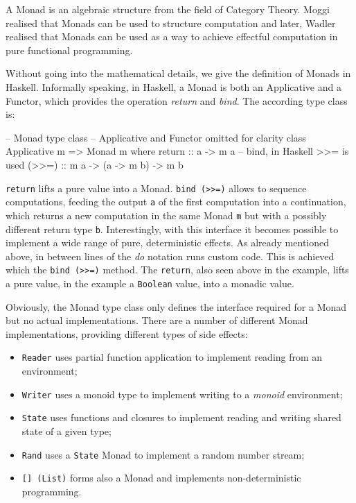 A Monad is an algebraic structure from the field of Category Theory. Moggi \cite{moggi_computational_1989} realised that Monads can be used to structure computation and later, Wadler \cite{wadler_monads_1995,wadler_how_1997} realised that Monads can be used as a way to achieve effectful computation in pure functional programming. 

Without going into the mathematical details, we give the definition of Monads in Haskell. Informally speaking, in Haskell, a Monad is both an Applicative and a Functor, which provides the operation \textit{return} and \textit{bind}. The according type class is:

\begin{HaskellCode}
-- Monad type class
-- Applicative and Functor omitted for clarity
class Applicative m => Monad m where
  return :: a -> m a
  -- bind, in Haskell >>= is used
  (>>=) :: m a -> (a -> m b) -> m b
\end{HaskellCode}

%

\texttt{return} lifts a pure value into a Monad. \texttt{bind (>>=)} allows to sequence computations, feeding the output \texttt{a} of the first computation into a continuation, which returns a new computation in the same Monad \texttt{m} but with a possibly different return type \texttt{b}. Interestingly, with this interface it becomes possible to implement a wide range of pure, deterministic effects. As already mentioned above, in between lines of the \textit{do} notation runs custom code. This is achieved which the \texttt{bind (>>=)} method. The \texttt{return}, also seen above in the example, lifts a pure value, in the example a \texttt{Boolean} value, into a monadic value.

Obviously, the Monad type class only defines the interface required for a Monad but no actual implementations. There are a number of different Monad implementations, providing different types of side effects:

\begin{itemize}
	\item \texttt{Reader} uses partial function application to implement reading from an environment;
	\item \texttt{Writer} uses a monoid type to implement writing to a \textit{monoid} environment;
	\item \texttt{State} uses functions and closures to implement reading and writing shared state of a given type;
	\item \texttt{Rand} uses a \texttt{State} Monad to implement a random number stream;
	\item \texttt{[] (List)} forms also a Monad and implements non-deterministic programming.
\end{itemize}

